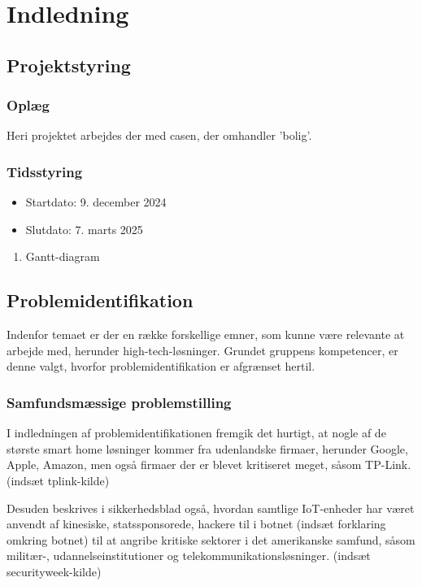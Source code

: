 \documentclass[11pt]{article}
\date{\today}
\title{}
\begin{document}
\tableofcontents

\section{Indledning}
\label{sec:org1a88e63}
\subsection{Projektstyring}
\label{sec:org10e56b3}
\subsubsection{Oplæg}
\label{sec:orgada9878}
Heri projektet arbejdes der med casen, der omhandler 'bolig'.
\subsubsection{Tidsstyring}
\label{sec:org4c3a4d6}
\begin{itemize}
\item Startdato: 9. december 2024
\item Slutdato: 7. marts 2025
\end{itemize}
\begin{enumerate}
\item Gantt-diagram
\label{sec:org0d6086f}
\end{enumerate}
\subsection{Problemidentifikation}
\label{sec:orge750b50}
Indenfor temaet er der en række forskellige emner, som kunne være relevante at arbejde med, herunder high-tech-løsninger. Grundet gruppens kompetencer, er denne valgt, hvorfor problemidentifikation er afgrænset hertil.
\subsubsection{Samfundsmæssige problemstilling}
\label{sec:org0626d2e}
I indledningen af problemidentifikationen fremgik det hurtigt, at nogle af de største smart home løsninger kommer fra udenlandske firmaer, herunder Google, Apple, Amazon, men også firmaer der er blevet kritiseret meget, såsom TP-Link. (indsæt tplink-kilde)

Desuden beskrives i sikkerhedsblad også, hvordan samtlige IoT-enheder har været anvendt af kinesiske, statssponsorede, hackere til i botnet (indsæt forklaring omkring botnet) til at angribe kritiske sektorer i det amerikanske samfund, såsom militær-, udannelseinstitutioner og telekommunikationsløsninger. (indsæt securityweek-kilde)
\end{document}
